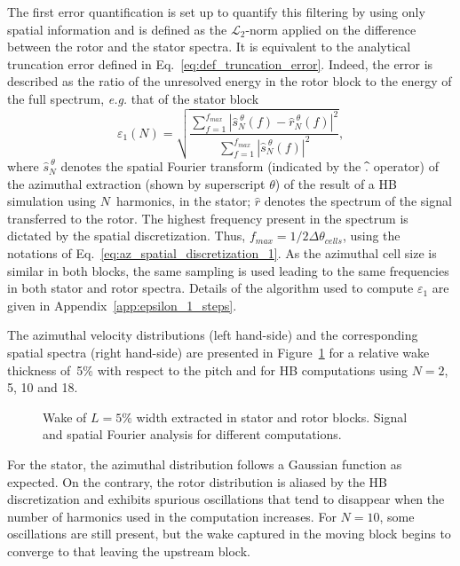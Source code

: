 The first error quantification is set up to quantify this filtering 
by using only spatial information and is defined as the $\mathcal{L}_2$-norm 
applied on the 
difference between the rotor and the stator spectra.
It is equivalent to the analytical truncation error 
defined in Eq.~\eqref{eq:def_truncation_error}. 
Indeed, the error is described as the ratio of the unresolved energy 
in the rotor block
to the energy of the full spectrum, 
\emph{e.g.} that of the stator block
\begin{equation}
    \varepsilon_1(N) = \sqrt{
    \frac{\sum_{f=1}^{f_{max}} | \widehat{s}^{~\theta}_N (f) - 
      \widehat{r}^{~\theta}_N (f)|^2}{ 
    \sum_{f=1}^{f_{max}} | \widehat{s}^{~\theta}_N (f)|^2}},
    \label{eq:def_crit_1}
\end{equation} 
where $\widehat{s}^{~\theta}_N$ denotes the spatial Fourier transform (indicated by
the $\widehat{\vphantom{s}.}$ operator) of the azimuthal extraction (shown
by superscript $\theta$) of the result of a HB simulation using $N$~harmonics,
in the stator; $\widehat{r}$ denotes the spectrum of 
the signal transferred to the rotor.
The highest frequency present in the spectrum is dictated 
by the spatial discretization. Thus, $f_{max} = 1 / 2\Delta \theta_{cells}$, 
using the notations of Eq.~\eqref{eq:az_spatial_discretization_1}.
As the azimuthal cell size is similar in both blocks, 
the same sampling is used leading to the same 
frequencies in both stator and rotor spectra.
Details of the algorithm used to compute $\varepsilon_1$ 
are given in Appendix~\ref{app:epsilon_1_steps}.

The azimuthal velocity distributions (left hand-side) and the corresponding spatial
spectra (right hand-side)
are presented in Figure~\ref{fig:spatial_crit} 
for a relative wake thickness of~5\% with respect to the pitch 
and for HB computations using $N=2$, 5, 10 and 18.
\begin{figure}[htp]
  \centering
  \caption{Wake of $L=5\%$ width extracted in stator and rotor 
  blocks. Signal and spatial Fourier analysis for different computations.}
  \label{fig:spatial_crit}
\end{figure}
For the stator, the azimuthal distribution follows a 
Gaussian function as expected. On the contrary, 
the rotor distribution is aliased by the HB discretization 
and exhibits spurious oscillations that tend to disappear
when the number of harmonics used in the computation 
increases.
For $N=10$, some oscillations are still present, 
but the wake captured in the moving block begins to 
converge to that leaving the upstream block.

